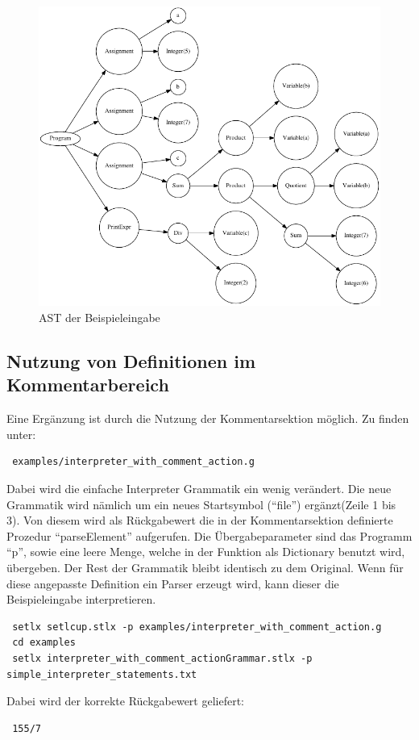 \begin{figure}[!htb]
	\centering
		\includegraphics{simple_interpreter_tree.pdf}
	\caption{AST der Beispieleingabe}
	\label{fig:interpreter_tree}
\end{figure}
\subsection{Nutzung von Definitionen im Kommentarbereich}
\label{subsec:programming_language_parser}
Eine Ergänzung ist durch die Nutzung der Kommentarsektion möglich.
Zu finden unter: 
\begin{Verbatim}
 examples/interpreter_with_comment_action.g
\end{Verbatim}
Dabei wird die einfache Interpreter Grammatik ein wenig verändert.
Die neue Grammatik wird nämlich um ein neues Startsymbol ("`file"') ergänzt(Zeile 1 bis 3). Von diesem wird als Rückgabewert die in der Kommentarsektion definierte Prozedur "`parseElement"' aufgerufen. Die Übergabeparameter sind das Programm "`p"', sowie eine leere Menge, welche in der Funktion als Dictionary benutzt wird, übergeben. Der Rest der Grammatik bleibt identisch zu dem Original.
Wenn für diese angepasste Definition ein Parser erzeugt wird, kann dieser die Beispieleingabe interpretieren.
\begin{Verbatim}
 setlx setlcup.stlx -p examples/interpreter_with_comment_action.g
 cd examples
 setlx interpreter_with_comment_actionGrammar.stlx -p simple_interpreter_statements.txt
\end{Verbatim}
Dabei wird der korrekte Rückgabewert geliefert:
\begin{Verbatim}
 155/7
\end{Verbatim}

